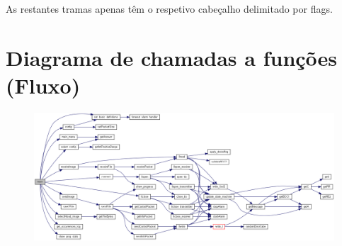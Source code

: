 \documentclass[11pt,a4paper,reqno]{report}
\numberwithin{equation}{section}
\begin{document}
\begin{appendices}
As restantes tramas apenas têm o respetivo cabeçalho delimitado por flags.


\chapter{Diagrama de chamadas a funções (Fluxo)}
\label{flux}
\begin{figure}
\centering
\includegraphics[width=26cm]{_app_8c_a3c04138a5bfe5d72780bb7e82a18e627_cgraph.png}
\end{figure}

\end{appendices}
\end{document}

